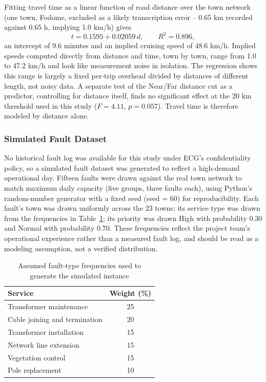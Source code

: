 \documentclass[11pt]{article}
\begin{document}
Fitting travel time as a linear function of road distance over the town network (one town, Fodome, excluded as a likely transcription error -- 0.65 km recorded against 0.65 h, implying 1.0 km/h) gives
\[
t = 0.1595 + 0.02059\,d, \qquad R^2 = 0.896,
\]
an intercept of 9.6 minutes and an implied cruising speed of 48.6 km/h. Implied speeds computed directly from distance and time, town by town, range from 1.0 to 47.2 km/h and look like measurement noise in isolation. The regression shows this range is largely a fixed per-trip overhead divided by distances of different length, not noisy data. A separate test of the Near/Far distance cut as a predictor, controlling for distance itself, finds no significant effect at the 20 km threshold used in this study ($F=4.11$, $p=0.057$). Travel time is therefore modeled by distance alone.

\subsubsection*{Simulated Fault Dataset}

No historical fault log was available for this study under ECG's confidentiality policy, so a simulated fault dataset was generated to reflect a high-demand operational day. Fifteen faults were drawn against the real town network to match maximum daily capacity (five groups, three faults each), using Python's random-number generator with a fixed seed (seed = 60) for reproducibility. Each fault's town was drawn uniformly across the 23 towns; its service type was drawn from the frequencies in Table~\ref{tab:weights}; its priority was drawn High with probability 0.30 and Normal with probability 0.70. These frequencies reflect the project team's operational experience rather than a measured fault log, and should be read as a modeling assumption, not a verified distribution.

\begin{table}[H]
\centering
\caption{Assumed fault-type frequencies used to generate the simulated instance}
\label{tab:weights}
\begin{tabular}{l c}
\toprule
Service & Weight (\%) \\
\midrule
Transformer maintenance & 25 \\
Cable joining and termination & 20 \\
Transformer installation & 15 \\
Network line extension & 15 \\
Vegetation control & 15 \\
Pole replacement & 10 \\
\bottomrule
\end{tabular}
\end{table}
\end{document}
